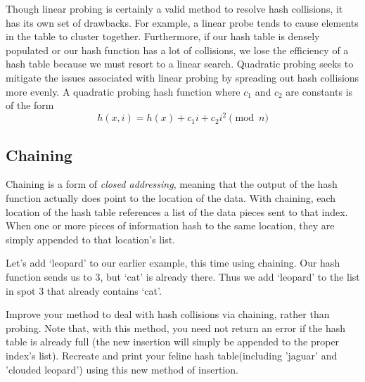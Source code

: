 Though linear probing is certainly a valid method to resolve hash collisions, it has its own set of drawbacks.
For example, a linear probe tends to cause elements in the table to cluster together.
Furthermore, if our hash table is densely populated or our hash function has a lot of collisions, we lose the efficiency of a hash table because we must resort to a linear search.
Quadratic probing seeks to mitigate the issues associated with linear probing by spreading out hash collisions more evenly.
A quadratic probing hash function where $c_1$ and $c_2$ are constants is of the form
\begin{equation*}
h(x, i) = h(x) + c_1i + c_2i^2 \pmod{n}
\end{equation*}

\subsection*{Chaining}
Chaining is a form of \emph{closed addressing}, meaning that the output of the hash function actually does point to the location of the data.
With chaining, each location of the hash table references a list of the data pieces sent to that index.
When one or more pieces of information hash to the same location, they are simply appended to that location's list.

Let's add `leopard' to our earlier example, this time using chaining.
Our hash function sends us to 3, but `cat' is already there.
Thus we add `leopard' to the list in spot 3 that already contains `cat'.
\begin{center}
\end{center}

\begin{problem}
Improve your  method to deal with hash collisions via chaining, rather than probing. 
Note that, with this method, you need not return an error if the hash table is already full (the new insertion will simply be appended to the proper index's list).
Recreate and print your feline hash table(including 'jaguar' and 'clouded leopard') using this new method of insertion. 
\label{prob:Chaining insert}
\end{problem}

